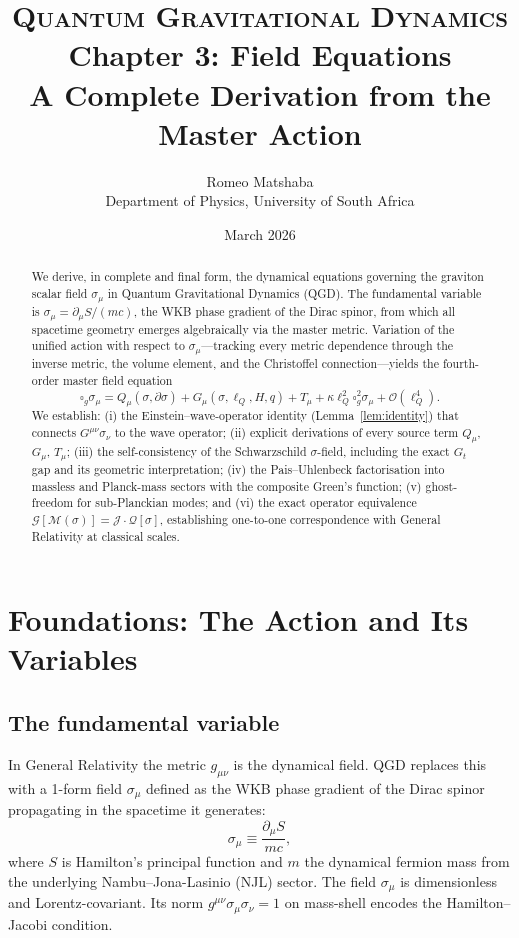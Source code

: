 \documentclass[11pt,a4paper]{article}
\title{%
  \vspace{-1.2cm}
  {\large\scshape Quantum Gravitational Dynamics}\\[6pt]
  {\LARGE\bfseries Chapter 3: Field Equations}\\[8pt]
  {\normalsize A Complete Derivation from the Master Action}
}
\author{%
  Romeo Matshaba\\[4pt]
  \normalsize Department of Physics, University of South Africa\\[2pt]
}
\date{March 2026}
\theoremstyle{plain}
\theoremstyle{definition}
\theoremstyle{remark}
\newcommand{\lQ}{\ell_Q}
\newcommand{\boxg}{\square_g}
\begin{document}
\maketitle
\thispagestyle{empty}

\begin{abstract}
\noindent
We derive, in complete and final form, the dynamical equations governing the graviton
scalar field $\sigma_\mu$ in Quantum Gravitational Dynamics (QGD).
The fundamental variable is $\sigma_\mu = \partial_\mu S/(mc)$, the WKB phase gradient
of the Dirac spinor, from which all spacetime geometry emerges algebraically via the
master metric.  Variation of the unified action with respect to $\sigma_\mu$---tracking
every metric dependence through the inverse metric, the volume element, and the
Christoffel connection---yields the fourth-order master field equation
\[
  \boxg\sigma_\mu = Q_\mu(\sigma,\partial\sigma) + G_\mu(\sigma,\lQ,H,q)
                  + T_\mu + \kappa\lQ^2\boxg^2\sigma_\mu + \mathcal{O}(\lQ^4).
\]
We establish: (i) the Einstein--wave-operator identity (Lemma~\ref{lem:identity})
that connects $G^{\mu\nu}\sigma_\nu$ to the wave operator; (ii) explicit derivations
of every source term $Q_\mu$, $G_\mu$, $T_\mu$; (iii) the self-consistency of the
Schwarzschild $\sigma$-field, including the exact $G_t$ gap and its geometric
interpretation; (iv) the Pais--Uhlenbeck factorisation into massless and Planck-mass
sectors with the composite Green's function; (v) ghost-freedom for sub-Planckian modes;
and (vi) the exact operator equivalence $\mathcal{G}[\mathcal{M}(\sigma)]
= \mathcal{J}\cdot\mathcal{Q}[\sigma]$, establishing one-to-one correspondence
with General Relativity at classical scales.
\end{abstract}

\tableofcontents
\newpage

\section{Foundations: The Action and Its Variables}
\label{sec:foundations}

\subsection{The fundamental variable}

In General Relativity the metric $g_{\mu\nu}$ is the dynamical field.  QGD replaces
this with a 1-form field $\sigma_\mu$ defined as the WKB phase gradient of the Dirac
spinor propagating in the spacetime it generates:
\begin{equation}
  \sigma_\mu \equiv \frac{\partial_\mu S}{mc},
  \label{eq:sigma_def}
\end{equation}
where $S$ is Hamilton's principal function and $m$ the dynamical fermion mass from the
underlying Nambu--Jona-Lasinio (NJL) sector.  The field $\sigma_\mu$ is dimensionless
and Lorentz-covariant.  Its norm $g^{\mu\nu}\sigma_\mu\sigma_\nu = 1$ on mass-shell
encodes the Hamilton--Jacobi condition.
\end{document}
